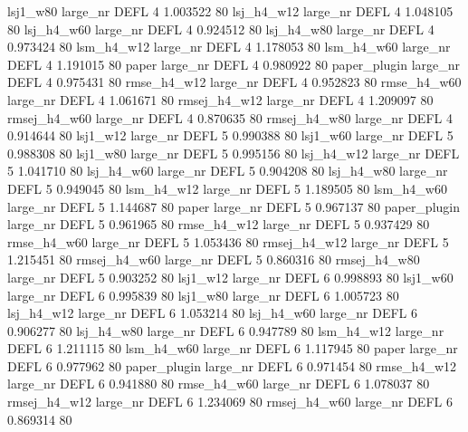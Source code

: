     lsj1_w80   large_nr     DEFL                 4 1.003522 80
  lsj_h4_w12   large_nr     DEFL                 4 1.048105 80
  lsj_h4_w60   large_nr     DEFL                 4 0.924512 80
  lsj_h4_w80   large_nr     DEFL                 4 0.973424 80
  lsm_h4_w12   large_nr     DEFL                 4 1.178053 80
  lsm_h4_w60   large_nr     DEFL                 4 1.191015 80
       paper   large_nr     DEFL                 4 0.980922 80
paper_plugin   large_nr     DEFL                 4 0.975431 80
 rmse_h4_w12   large_nr     DEFL                 4 0.952823 80
 rmse_h4_w60   large_nr     DEFL                 4 1.061671 80
rmsej_h4_w12   large_nr     DEFL                 4 1.209097 80
rmsej_h4_w60   large_nr     DEFL                 4 0.870635 80
rmsej_h4_w80   large_nr     DEFL                 4 0.914644 80
    lsj1_w12   large_nr     DEFL                 5 0.990388 80
    lsj1_w60   large_nr     DEFL                 5 0.988308 80
    lsj1_w80   large_nr     DEFL                 5 0.995156 80
  lsj_h4_w12   large_nr     DEFL                 5 1.041710 80
  lsj_h4_w60   large_nr     DEFL                 5 0.904208 80
  lsj_h4_w80   large_nr     DEFL                 5 0.949045 80
  lsm_h4_w12   large_nr     DEFL                 5 1.189505 80
  lsm_h4_w60   large_nr     DEFL                 5 1.144687 80
       paper   large_nr     DEFL                 5 0.967137 80
paper_plugin   large_nr     DEFL                 5 0.961965 80
 rmse_h4_w12   large_nr     DEFL                 5 0.937429 80
 rmse_h4_w60   large_nr     DEFL                 5 1.053436 80
rmsej_h4_w12   large_nr     DEFL                 5 1.215451 80
rmsej_h4_w60   large_nr     DEFL                 5 0.860316 80
rmsej_h4_w80   large_nr     DEFL                 5 0.903252 80
    lsj1_w12   large_nr     DEFL                 6 0.998893 80
    lsj1_w60   large_nr     DEFL                 6 0.995839 80
    lsj1_w80   large_nr     DEFL                 6 1.005723 80
  lsj_h4_w12   large_nr     DEFL                 6 1.053214 80
  lsj_h4_w60   large_nr     DEFL                 6 0.906277 80
  lsj_h4_w80   large_nr     DEFL                 6 0.947789 80
  lsm_h4_w12   large_nr     DEFL                 6 1.211115 80
  lsm_h4_w60   large_nr     DEFL                 6 1.117945 80
       paper   large_nr     DEFL                 6 0.977962 80
paper_plugin   large_nr     DEFL                 6 0.971454 80
 rmse_h4_w12   large_nr     DEFL                 6 0.941880 80
 rmse_h4_w60   large_nr     DEFL                 6 1.078037 80
rmsej_h4_w12   large_nr     DEFL                 6 1.234069 80
rmsej_h4_w60   large_nr     DEFL                 6 0.869314 80
